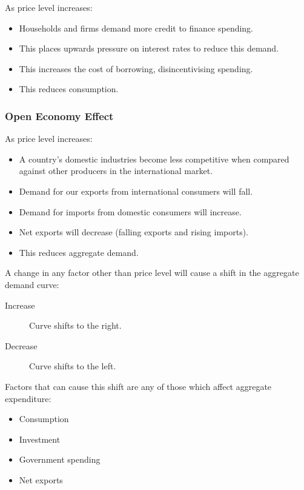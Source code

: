 \documentclass[a4paper,11pt]{article}
\begin{document}
As price level increases:

\begin{itemize}
\item Households and firms demand more credit to finance spending.
\item This places upwards pressure on interest rates to reduce this demand.
\item This increases the cost of borrowing, disincentivising spending.
\item This reduces consumption.
\end{itemize}


\subsubsection{Open Economy Effect}

As price level increases:

\begin{itemize}
\item A country's domestic industries become less competitive when compared
	against other producers in the international market.
\item Demand for our exports from international consumers will fall.
\item Demand for imports from domestic consumers will increase.
\item Net exports will decrease (falling exports and rising imports).
\item This reduces aggregate demand.
\end{itemize}



A change in any factor other than price level will cause a shift in the
aggregate demand curve:

\begin{description}
\item [Increase] Curve shifts to the right.
\item [Decrease] Curve shifts to the left.
\end{description}

Factors that can cause this shift are any of those which affect aggregate
expenditure:

\begin{itemize}
\item Consumption
\item Investment
\item Government spending
\item Net exports
\end{itemize}
\end{document}
